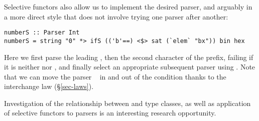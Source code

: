 Selective functors also allow us to implement the desired parser, and arguably
in a more direct style that does not involve trying one parser after another:

\vspace{1mm}
\begin{verbatim}
numberS :: Parser Int
numberS = string "0" *> ifS (('b'==) <$> sat (`elem` "bx")) bin hex
\end{verbatim}
\vspace{1mm}

\noindent
Here we first parse the leading , then the second character of the
prefix, failing if it is neither  nor , and finally select an
appropriate subsequent parser using . Note that we can move the parser
~ in and out of the condition  thanks to the
interchange law (\S\ref{sec-laws}).

Investigation of the relationship between  and 
type classes, as well as application of selective functors to parsers is an
interesting research opportunity.
